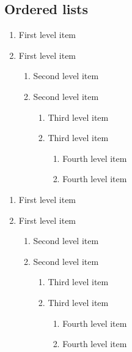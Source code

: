 \documentclass{article}
\begin{document}
\subsection{Ordered lists}

\begin{enumerate}
    \item First level item
    \item First level item
        \begin{enumerate}
            \item Second level item
            \item Second level item
                \begin{enumerate}
                    \item Third level item
                    \item Third level item
                        \begin{enumerate}
                            \item Fourth level item
                            \item Fourth level item
                        \end{enumerate}
                 \end{enumerate}
         \end{enumerate}
 \end{enumerate}
 
\renewcommand{\labelenumii}{\Roman{enumii}}
\begin{enumerate}
    \item First level item
    \item First level item
        \begin{enumerate}
            \item Second level item
            \item Second level item
                \begin{enumerate}
                    \item Third level item
                    \item Third level item
                        \begin{enumerate}
                            \item Fourth level item
                            \item Fourth level item
                        \end{enumerate}
                \end{enumerate}
        \end{enumerate}
\end{enumerate}
 
\end{document}
